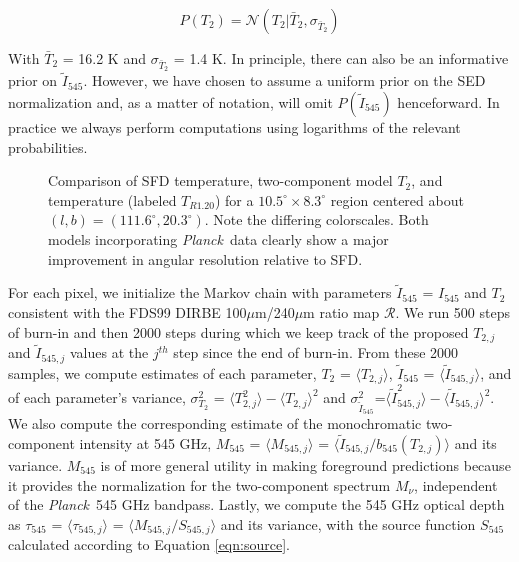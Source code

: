 \documentclass{emulateapj}
\newcommand{\PLANCK}{{\it Planck}}
\begin{document}

\begin{equation} \label{equ:t2prior}
P(T_2) = \mathcal{N}(T_2|\bar{T}_2, \sigma_{\bar{T}_2})
\end{equation}


With $\bar{T}_2$ = 16.2 K and $\sigma_{\bar{T}_2}$ = 1.4 K. In principle, there
can also be an informative prior on $\tilde{I}_{545}$. However, we have chosen 
to assume a uniform prior on the SED normalization and, as a matter of 
notation, will omit $P(\tilde{I}_{545})$ henceforward. In practice we always 
perform computations using logarithms of the relevant probabilities.

\begin{figure}
\begin{center}
\caption{\label{fig:comparison} Comparison of SFD temperature, two-component 
model $T_2$, and \cite{planckdust} temperature (labeled $T_{R1.20}$) for a
 $10.5^{\circ}\times8.3^{\circ}$  region centered about 
$(l,b) = (111.6^{\circ}, 20.3^{\circ})$. Note the differing colorscales. Both 
models incorporating \PLANCK~data clearly show a major improvement in angular 
resolution relative to SFD.}
\end{center}
\end{figure}

For each pixel, we initialize the Markov chain with parameters 
$\tilde{I}_{545}$ = $I_{545}$ and $T_2$ consistent with the FDS99 
DIRBE 100$\mu$m/240$\mu$m ratio map $\mathscr{R}$. We run 500 steps of burn-in 
and then 2000 steps during which we keep track of the proposed $T_{2, j}$ and 
$\tilde{I}_{545, j}$ values at the $j^{th}$ step since the end of burn-in. From
 these 2000 samples, we compute estimates of each parameter, 
$T_2$ = $\langle T_{2, j} \rangle$, $\tilde{I}_{545}$ = 
$\langle \tilde{I}_{545, j} \rangle$, and of each parameter's variance, 
$\sigma^2_{T_2}$ = $\langle T^2_{2, j} \rangle-\langle T_{2, j} \rangle ^2$ and
 $\sigma^2_{\tilde{I}_{545}}$=$\langle \tilde{I}^2_{545, j} 
\rangle-\langle \tilde{I}_{545, j} \rangle ^2$. We also compute the
 corresponding estimate of the monochromatic two-component intensity at 545 
GHz, $M_{545}$ = $\langle M_{545, j} \rangle$ = 
$\langle \tilde{I}_{545, j}/b_{545}(T_{2,j}) \rangle$  and its variance. 
$M_{545}$ is of more general utility in making foreground predictions because 
it provides the normalization for the two-component spectrum $M_{\nu}$, 
independent of the \PLANCK~545 GHz bandpass. Lastly, we compute the 545 GHz
optical depth as $\tau_{545}$ = $\langle \tau_{545, j} \rangle$ = 
$\langle M_{545, j}/S_{545, j} \rangle$ and its variance, with the source 
function $S_{545}$ calculated according to Equation \ref{eqn:source}.
\end{document}
